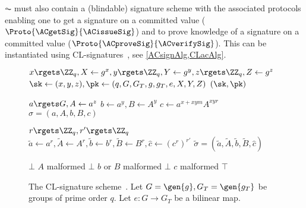 \(\AC\) must also contain a (blindable) signature scheme with the associated 
protocols enabling one to get a signature on a committed value 
(\(\Proto{\ACgetSig}{\ACissueSig}\)) and to prove knowledge of a signature on a 
committed value (\(\Proto{\ACproveSig}{\ACverifySig}\)).
This can be instantiated using CL-signatures~\cite{CLsignatures}, see 
\cref{ACsignAlg,CLacAlg}.

\begin{figure}
  \small
  \begin{algorithmic}
    \Function{\CLsetup}{}
    \State $x\rgets \ZZ_q, X\gets g^x, y\rgets \ZZ_q, Y\gets g^y, z\rgets 
    \ZZ_q, Z\gets g^z$
    \State $\sk\gets (x,y,z), \pk\gets (q, G, G_T, g, g_T, e, X, Y, Z)$
    \State \Return $(\sk, \pk)$
    \EndFunction

    \State $a\rgets G, A\gets a^z$
    \State $b\gets a^y, B\gets A^y$
    \State $c\gets a^{x+xym} A^{xyr}$
    \State \Return $\sigma = (a, A, b, B, c)$
    \EndFunction

    \State $r\rgets \ZZ_q, r'\rgets \ZZ_q$
    \State $\tilde a\gets a^r, \tilde A\gets A^r,
      \tilde b\gets b^r, \tilde B\gets B^r,
      \hat c\gets (c^r)^{r'}$
    \State \Return $\tilde \sigma = (\tilde a, \tilde A,
      \tilde b, \tilde B, \hat c)$
    \EndFunction

    \State \Return $\bot$
    \Comment $A$ malformed
    \State \Return $\bot$
    \Comment $b$ or $B$ malformed
    \State \Return $\bot$
    \Comment $c$ malformed
    \EndIf
    \State \Return $\top$
    \EndFunction

  \end{algorithmic}
  \caption{\label{ACsignAlg}%
    The CL-signature scheme~\cite{CLsignatures}.
    Let \(G = \gen{g}, G_T = \gen{g_T}\) be groups of prime order \(q\).
    Let \(e\colon G\to G_T\) be a bilinear map.
  }
\end{figure}

